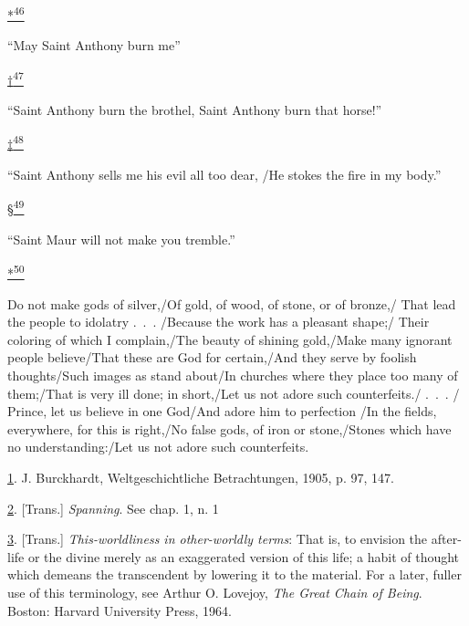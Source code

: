 \protect\hypertarget{23_NOTES.xhtmlux5cux23id_3068}{\protect\hyperlink{13_Chapter_Six__THE_DEPICTION_OF_TH.xhtmlux5cux23id_3067}{*\textsuperscript{46}}}
``May Saint Anthony burn me''

\protect\hypertarget{23_NOTES.xhtmlux5cux23id_3070}{\protect\hyperlink{13_Chapter_Six__THE_DEPICTION_OF_TH.xhtmlux5cux23id_3069}{†\textsuperscript{47}}}
``Saint Anthony burn the brothel, Saint Anthony burn that horse!''

\protect\hypertarget{23_NOTES.xhtmlux5cux23id_3072}{\protect\hyperlink{13_Chapter_Six__THE_DEPICTION_OF_TH.xhtmlux5cux23id_3071}{‡\textsuperscript{48}}}
``Saint Anthony sells me his evil all too dear, /He stokes the fire in
my body.''

\protect\hypertarget{23_NOTES.xhtmlux5cux23id_3074}{\protect\hyperlink{13_Chapter_Six__THE_DEPICTION_OF_TH.xhtmlux5cux23id_3073}{§\textsuperscript{49}}}
``Saint Maur will not make you tremble.''

\protect\hypertarget{23_NOTES.xhtmlux5cux23id_3076}{\protect\hyperlink{13_Chapter_Six__THE_DEPICTION_OF_TH.xhtmlux5cux23id_3075}{*\textsuperscript{50}}}
Do not make gods of silver,/Of gold, of wood, of stone, or of bronze,/
That lead the people to idolatry .~.~. /Because the work has a pleasant
shape;/ Their coloring of which I complain,/The beauty of shining
gold,/Make many ignorant people believe/That these are God for
certain,/And they serve by foolish thoughts/Such images as stand
about/In churches where they place too many of them;/That is very ill
done; in short,/Let us not adore such counterfeits./ .~.~. / Prince, let
us believe in one God/And adore him to perfection /In the fields,
everywhere, for this is right,/No false gods, of iron or stone,/Stones
which have no understanding:/Let us not adore such counterfeits.

\protect\hypertarget{23_NOTES.xhtmlux5cux23id_1270}{\protect\hyperlink{13_Chapter_Six__THE_DEPICTION_OF_TH.xhtmlux5cux23id_1269}{1}}.
J. Burckhardt, Weltgeschichtliche Betrachtungen, 1905, p. 97, 147.

\protect\hypertarget{23_NOTES.xhtmlux5cux23id_1268}{\protect\hyperlink{13_Chapter_Six__THE_DEPICTION_OF_TH.xhtmlux5cux23id_1267}{2}}.
{[}Trans.{]} \emph{Spanning}. See chap. 1, n. 1

\protect\hypertarget{23_NOTES.xhtmlux5cux23id_1266}{\protect\hyperlink{13_Chapter_Six__THE_DEPICTION_OF_TH.xhtmlux5cux23id_1265}{3}}.
{[}Trans.{]} \emph{This-worldliness in other-worldly terms}: That is, to
envision the after-life or the divine merely as an exaggerated version
of this life; a habit of thought which demeans the transcendent by
lowering it to the material. For a later, fuller use of this
terminology, see Arthur O. Lovejoy, \emph{The Great Chain of Being}.
Boston: Harvard University Press, 1964.

